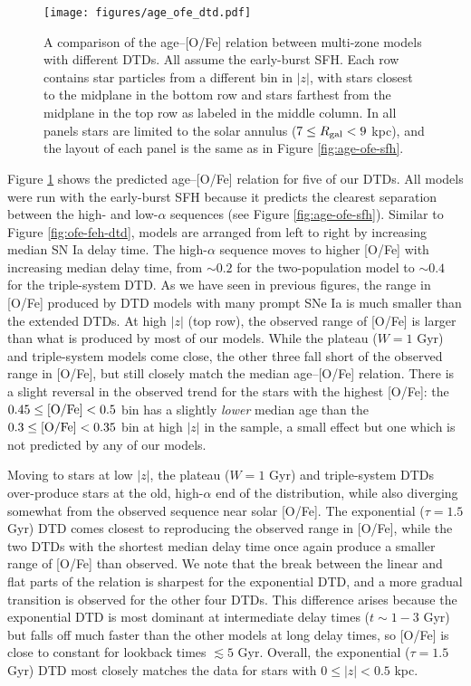 \documentclass[twocolumn,twocolappendix,linenumbers]{aastex631}
\begin{document}
\begin{figure*}
    \centering
    \texttt{[image: figures/age\_ofe\_dtd.pdf]}
    \caption{A comparison of the age--[O/Fe] relation between multi-zone models with different DTDs. All assume the early-burst SFH. Each row contains star particles from a different bin in $|z|$, with stars closest to the midplane in the bottom row and stars farthest from the midplane in the top row as labeled in the middle column. In all panels stars are limited to the solar annulus ($7\leq R_{\rm gal}<9$ kpc), and the layout of each panel is the same as in Figure \ref{fig:age-ofe-sfh}.}
    \label{fig:age-ofe-dtd}
\end{figure*}

Figure \ref{fig:age-ofe-dtd} shows the predicted age--[O/Fe] relation for five of our DTDs. All models were run with the early-burst SFH because it predicts the clearest separation between the high- and low-$\alpha$ sequences (see Figure \ref{fig:age-ofe-sfh}). Similar to Figure \ref{fig:ofe-feh-dtd}, models are arranged from left to right by increasing median SN Ia delay time. The high-$\alpha$ sequence moves to higher [O/Fe] with increasing median delay time, from $\sim0.2$ for the two-population model to $\sim0.4$ for the triple-system DTD. As we have seen in previous figures, the range in [O/Fe] produced by DTD models with many prompt SNe Ia is much smaller than the extended DTDs. At high $|z|$ (top row), the observed range of [O/Fe] is larger than what is produced by most of our models. While the plateau ($W=1$ Gyr) and triple-system models come close, the other three fall short of the observed range in [O/Fe], but still closely match the median age--[O/Fe] relation. There is a slight reversal in the observed trend for the stars with the highest [O/Fe]: the $0.45\leq{\rm [O/Fe]}<0.5$ bin has a slightly \textit{lower} median age than the $0.3\leq{\rm [O/Fe]}<0.35$ bin at high $|z|$ in the  sample, a small effect but one which is not predicted by any of our models.

Moving to stars at low $|z|$, the plateau ($W=1$ Gyr) and triple-system DTDs over-produce stars at the old, high-$\alpha$ end of the distribution, while also diverging somewhat from the observed sequence near solar [O/Fe]. The exponential ($\tau=1.5$ Gyr) DTD comes closest to reproducing the observed range in [O/Fe], while the two DTDs with the shortest median delay time once again produce a smaller range of [O/Fe] than observed. We note that the break between the linear and flat parts of the relation is sharpest for the exponential DTD, and a more gradual transition is observed for the other four DTDs. This difference arises because the exponential DTD is most dominant at intermediate delay times ($t\sim 1-3$ Gyr) but falls off much faster than the other models at long delay times, so [O/Fe] is close to constant for lookback times $\lesssim 5$ Gyr. Overall, the exponential ($\tau=1.5$ Gyr) DTD most closely matches the data for stars with $0\leq|z|<0.5$ kpc.
\end{document}
